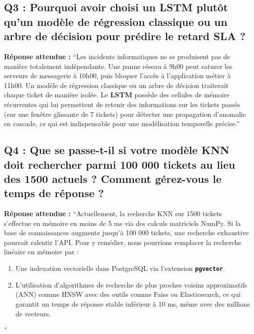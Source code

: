 \documentclass[11pt,a4paper]{article}
\begin{document}
\subsection*{Q3 : Pourquoi avoir choisi un LSTM plutôt qu'un modèle de régression classique ou un arbre de décision pour prédire le retard SLA ?}
\begin{responsebox}
\textbf{Réponse attendue :} ``Les incidents informatiques ne se produisent pas de manière totalement indépendante. Une panne réseau à 9h00 peut saturer les serveurs de messagerie à 10h00, puis bloquer l'accès à l'application métier à 11h00. Un modèle de régression classique ou un arbre de décision traiterait chaque ticket de manière isolée. Le \textbf{LSTM} possède des cellules de mémoire récurrentes qui lui permettent de retenir des informations sur les tickets passés (sur une fenêtre glissante de 7 tickets) pour détecter une propagation d'anomalie en cascade, ce qui est indispensable pour une modélisation temporelle précise.''
\end{responsebox}

\subsection*{Q4 : Que se passe-t-il si votre modèle KNN doit rechercher parmi 100 000 tickets au lieu des 1500 actuels ? Comment gérez-vous le temps de réponse ?}
\begin{responsebox}
\textbf{Réponse attendue :} ``Actuellement, la recherche KNN sur 1500 tickets s'effectue en mémoire en moins de 5 ms via des calculs matriciels NumPy. Si la base de connaissances augmente jusqu'à 100 000 tickets, une recherche exhaustive pourrait ralentir l'API. Pour y remédier, nous pourrions remplacer la recherche linéaire en mémoire par :
\begin{enumerate}
    \item Une indexation vectorielle dans PostgreSQL via l'extension \textbf{\texttt{pgvector}}.
    \item L'utilisation d'algorithmes de recherche de plus proches voisins approximatifs (ANN) comme HNSW avec des outils comme Faiss ou Elasticsearch, ce qui garantit un temps de réponse stable inférieur à 10 ms, même avec des millions de vecteurs.
\end{enumerate}''
\end{responsebox}
\end{document}
